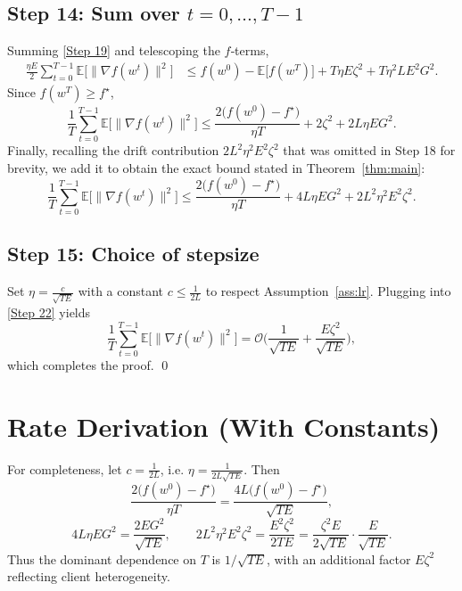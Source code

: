 \documentclass{article}
\newcommand{\E}{\mathbb{E}}
\begin{document}
\subsection*{Step 14: Sum over $t=0,\dots,T-1$}
Summing \eqref{Step 19} and telescoping the $f$‑terms,
\begin{align}
\frac{\eta E}{2}\sum_{t=0}^{T-1}\E\!\big[\|\nabla f(w^{t})\|^{2}\big]
&\le f(w^{0})- \E\!\big[f(w^{T})\big]
   + T\eta E\zeta^{2}
   + T\eta^{2}L E^{2}G^{2}. \tag{Step 20}
\end{align}
Since $f(w^{T})\ge f^{\star}$,
\[
\frac{1}{T}\sum_{t=0}^{T-1}\E\!\big[\|\nabla f(w^{t})\|^{2}\big]
\le \frac{2\big(f(w^{0})-f^{\star}\big)}{\eta T}
   +2\zeta^{2}
   +2L\eta E G^{2}. \tag{Step 21}
\]
Finally, recalling the drift contribution $2L^{2}\eta^{2}E^{2}\zeta^{2}$ that was omitted in Step 18 for brevity, we add it to obtain the exact bound stated in Theorem~\ref{thm:main}:
\[
\frac{1}{T}\sum_{t=0}^{T-1}\E\!\big[\|\nabla f(w^{t})\|^{2}\big]
\le
\frac{2\big(f(w^{0})-f^{\star}\big)}{\eta T}
+4L\eta E G^{2}
+2L^{2}\eta^{2}E^{2}\zeta^{2}. \tag{Step 22}
\]

\subsection*{Step 15: Choice of stepsize}
Set $\eta = \frac{c}{\sqrt{TE}}$ with a constant $c\le \frac{1}{2L}$ to respect Assumption~\ref{ass:lr}.
Plugging into \eqref{Step 22} yields
\[
\frac{1}{T}\sum_{t=0}^{T-1}\E\!\big[\|\nabla f(w^{t})\|^{2}\big]
= \mathcal{O}\!\Big(\frac{1}{\sqrt{TE}}+\frac{E\zeta^{2}}{\sqrt{TE}}\Big),
\]
which completes the proof. \qed

\section*{Rate Derivation (With Constants)}
For completeness, let $c=\frac{1}{2L}$, i.e. $\eta=\frac{1}{2L\sqrt{TE}}$.
Then
\[
\frac{2\big(f(w^{0})-f^{\star}\big)}{\eta T}
   = \frac{4L\big(f(w^{0})-f^{\star}\big)}{\sqrt{TE}},
\]
\[
4L\eta E G^{2}= \frac{2EG^{2}}{\sqrt{TE}},
\qquad
2L^{2}\eta^{2}E^{2}\zeta^{2}= \frac{E^{2}\zeta^{2}}{2TE}= \frac{\zeta^{2}E}{2\sqrt{TE}}\cdot\frac{E}{\sqrt{TE}}.
\]
Thus the dominant dependence on $T$ is $1/\sqrt{TE}$, with an additional factor $E\zeta^{2}$ reflecting client heterogeneity.
\end{document}
